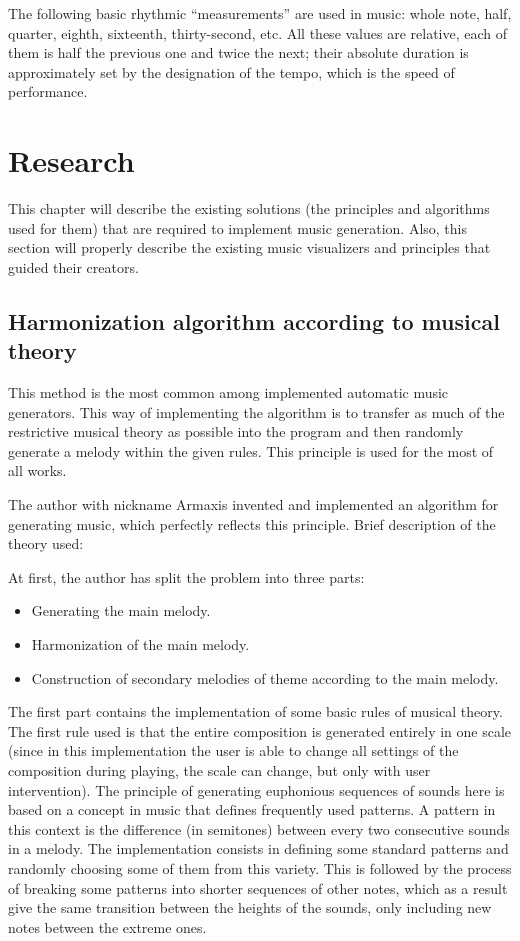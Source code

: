 \documentclass[thesis=B,english]{FITthesis}[2019/12/23]
\begin{document}
The following basic rhythmic “measurements” are used in music: whole note, half, quarter, eighth, sixteenth, thirty-second, etc. All these values are relative, each of them is half the previous one and twice the next; their absolute duration is approximately set by the designation of the tempo, which is the speed of performance.

\chapter{Research}

This chapter will describe the existing solutions (the principles and algorithms used for them) that are required to implement music generation. Also, this section will properly describe the existing music visualizers and principles that guided their creators.

\section{Harmonization algorithm according to musical theory}

This method is the most common among implemented automatic music generators. This way of implementing the algorithm is to transfer as much of the restrictive musical theory as possible into the program and then randomly generate a melody within the given rules. This principle is used for the most of all works.

The author with nickname Armaxis \cite{Habr_Armaxis} invented and implemented an algorithm for generating music, which perfectly reflects this principle. Brief description of the theory used:

At first, the author has split the problem into three parts:
\begin{itemize}
    \item Generating the main melody.
    \item Harmonization of the main melody.
    \item Construction of secondary melodies of theme according to the main melody.
\end{itemize}
The first part contains the implementation of some basic rules of musical theory. The first rule used is that the entire composition is generated entirely in one scale (since in this implementation the user is able to change all settings of the composition during playing, the scale can change, but only with user intervention). The principle of generating euphonious sequences of sounds here is based on a concept in music that defines frequently used patterns. A pattern in this context is the difference (in semitones) between every two consecutive sounds in a melody. The implementation consists in defining some standard patterns and randomly choosing some of them from this variety. This is followed by the process of breaking some patterns into shorter sequences of other notes, which as a result give the same transition between the heights of the sounds, only including new notes between the extreme ones.
\end{document}
